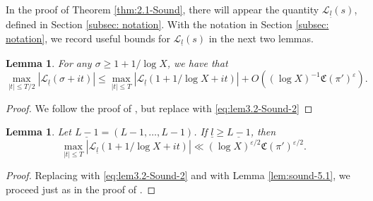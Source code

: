 \documentclass[12pt,reqno]{amsart}
\newtheorem{lem}[thm]{Lemma}
\theoremstyle{remark}
\numberwithin{equation}{section}
\begin{document}
    In the proof of Theorem \ref{thm:2.1-Sound}, there will appear the quantity 
    $\mathcal{L}_{\underline{l}}(s)$, defined in Section \ref{subsec: notation}. With the notation in Section \ref{subsec: notation}, we record  useful bounds for $\mathcal{L}_{\underline{l}}(s)$ in the next two lemmas. 
    \begin{lem}\label{lem:sound-5.2}
		 For any $\sigma \ge 1+1/\log X$, we have that
        \begin{equation*}
			\max_{|t| \le T/2} |\mathcal{L}_{\underline{l}}(\sigma+it)| \le \max_{|t| \le T}|\mathcal{L}_{\underline{l}}(1+1/\log{X}+it)| + O((\log X)^{-1}\mathfrak{C}(\pi')^\varepsilon).
		\end{equation*}
    \end{lem}
    \begin{proof}
		We follow the proof of \cite[Lemma 5.2]{S}, but replace \cite[Lemma 3.2]{S} with \eqref{eq:lem3.2-Sound-2} 
	\end{proof}
	\begin{lem}\label{lem:sound-5.3}
     Let $\underline{L-1}=(L-1,\ldots,L-1)$.  If $\underline{l}\geq \underline{L-1}$, then
		 \begin{equation*}
			\max_{|t| \le T} |\mathcal{L}_{\underline{l}}(1+1/\log{X}+it )| \ll (\log X)^{\varepsilon/2}\mathfrak{C}(\pi')^{\varepsilon/2}.
		\end{equation*}
	\end{lem}
	\begin{proof}
		Replacing \cite[Lemma 3.2]{S}  with \eqref{eq:lem3.2-Sound-2} and \cite[Lemma 5.1]{S} with Lemma \ref{lem:sound-5.1}, we proceed just as in  the proof of \cite[Lemma 5.3]{S}.
	\end{proof}
	
\end{document}
